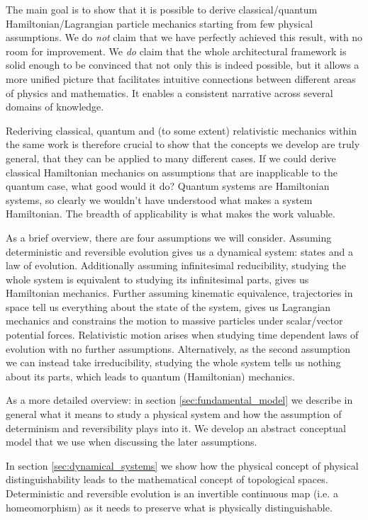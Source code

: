 \documentclass[smallextended]{svjour3}
\numberwithin{equation}{section}
\begin{document}
The main goal is to show that it is possible to derive classical/quantum Hamiltonian/Lagrangian particle mechanics starting from few physical assumptions. We do \emph{not} claim that we have perfectly achieved this result, with no room for improvement. We \emph{do} claim that the whole architectural framework is solid enough to be convinced that not only this is indeed possible, but it allows a more unified picture that facilitates intuitive connections between different areas of physics and mathematics. It enables a consistent narrative across several domains of knowledge.

Rederiving classical, quantum and (to some extent) relativistic mechanics within the same work is therefore crucial to show that the concepts we develop are truly general, that they can be applied to many different cases. If we could derive classical Hamiltonian mechanics on assumptions that are inapplicable to the quantum case, what good would it do? Quantum systems are Hamiltonian systems, so clearly we wouldn't have understood what makes a system Hamiltonian. The breadth of applicability is what makes the work valuable.

As a brief overview, there are four assumptions we will consider. Assuming deterministic and reversible evolution gives us a dynamical system: states and a law of evolution. Additionally assuming infinitesimal reducibility, studying the whole system is equivalent to studying its infinitesimal parts, gives us Hamiltonian mechanics. Further assuming kinematic equivalence, trajectories in space tell us everything about the state of the system, gives us Lagrangian mechanics and constrains the motion to massive particles under scalar/vector potential forces. Relativistic motion arises when studying time dependent laws of evolution with no further assumptions. Alternatively, as the second assumption we can instead take irreducibility, studying the whole system tells us nothing about its parts, which leads to quantum (Hamiltonian) mechanics.

As a more detailed overview: in section \ref{sec:fundamental_model} we describe in general what it means to study a physical system and how the assumption of determinism and reversibility plays into it. We develop an abstract conceptual model that we use when discussing the later assumptions.

In section \ref{sec:dynamical_systems} we show how the physical concept of physical distinguishability leads to the mathematical concept of topological spaces. Deterministic and reversible evolution is an invertible continuous map (i.e. a homeomorphism) as it needs to preserve what is physically distinguishable.
\end{document}
